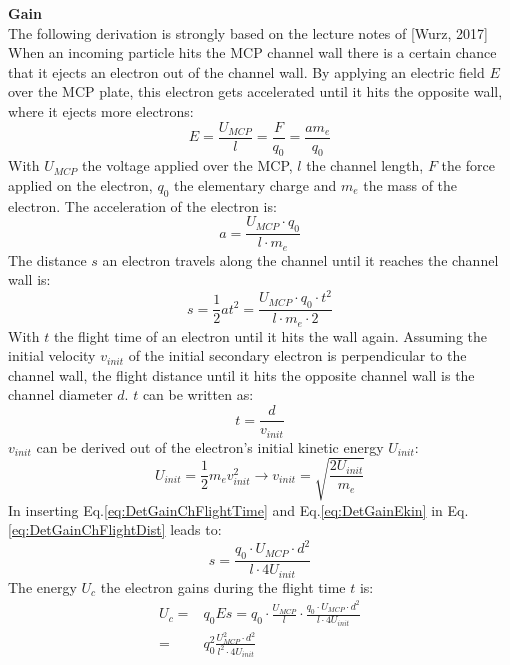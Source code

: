 		\textbf{Gain}\\
		The following derivation is strongly based on the lecture notes of [Wurz, 2017] %
		When an incoming particle hits the MCP channel wall there is a certain chance that it ejects an electron out of the channel wall. By applying an electric field $E$ over the MCP plate, this electron gets accelerated until it hits the opposite wall, where it ejects more electrons:
		\begin{equation}
			E = \frac{U_{MCP}}{l} = \frac{F}{q_0} = \frac{a m_e}{q_0}
		\end{equation}
		With $U_{MCP}$ the voltage applied over the MCP, $l$ the channel length, $F$ the force applied on the electron, $q_0$ the elementary charge and $m_e$ the mass of the electron. The acceleration of the electron is:		
		\begin{equation}
			a = \frac{U_{MCP}\cdot q_0}{l\cdot m_e}
		\end{equation}
		The distance $s$ an electron travels along the channel until it reaches the channel wall is:
		\begin{equation}
			s = \frac{1}{2}at^2 = \frac{U_{MCP}\cdot q_0\cdot t^2}{l\cdot m_e\cdot 2}
			\label{eq:DetGainChFlightDist}
		\end{equation}
		With $t$ the flight time of an electron until it hits the wall again. Assuming the initial velocity $v_{init}$ of the initial secondary electron is perpendicular to the channel wall, the flight distance until it hits the opposite channel wall is the channel diameter $d$. $t$ can be written as:
		\begin{equation}
			t = \frac{d}{v_{init}}
			\label{eq:DetGainChFlightTime}
		\end{equation}
		$v_{init}$ can be derived out of the electron's initial kinetic energy $U_{init}$:
		\begin{equation}
			U_{init} = \frac{1}{2}m_e v_{init}^2 \rightarrow v_{init} = \sqrt{\frac{2U_{init}}{m_e}}
			\label{eq:DetGainEkin}
		\end{equation}
		In inserting Eq.\eqref{eq:DetGainChFlightTime} and Eq.\eqref{eq:DetGainEkin} in Eq.\eqref{eq:DetGainChFlightDist} leads to:
		\begin{equation}
			s = \frac{q_0 \cdot U_{MCP}\cdot d^2}{l\cdot 4U_{init}}
			\label{eq:DetGainDistECh}
		\end{equation}
		The energy $U_c$ the electron gains during the flight time $t$ is:
		\begin{align}
			U_c = &q_0 Es = q_0\cdot \frac{U_{MCP}}{l}\cdot\frac{q_0\cdot U_{MCP}\cdot d^2}{l\cdot 4 U_{init}}\\
			= &q_0^2 \frac{U_{MCP}^2\cdot d^2}{l^2\cdot 4U_{init}}
		\end{align}
